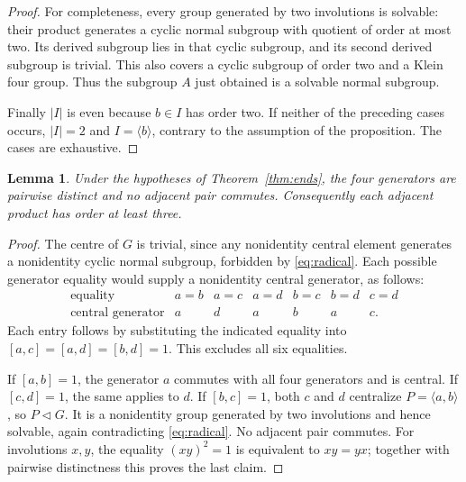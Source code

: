 \documentclass[11pt]{article}
\newtheorem{lemma}[theorem]{Lemma}
\theoremstyle{definition}\newtheorem{definition}[theorem]{Definition}
\newcommand{\gen}[1]{\langle #1\rangle}
\begin{document}
\begin{proof}
For completeness, every group generated by two involutions is solvable:
their product generates a cyclic normal subgroup with quotient of order
at most two.  Its derived subgroup lies in that cyclic subgroup, and its
second derived subgroup is trivial.  This also covers a cyclic subgroup
of order two and a Klein four group.  Thus the subgroup $A$ just obtained
is a solvable normal subgroup.

Finally $|I|$ is even because $b\in I$ has order two.  If neither of
the preceding cases occurs, $|I|=2$ and $I=\gen b$, contrary to the
assumption of the proposition.  The cases are exhaustive.
\end{proof}

\begin{lemma}\label{lem:degeneracies}
Under the hypotheses of Theorem~\ref{thm:ends}, the four generators are
pairwise distinct and no adjacent pair commutes.  Consequently each
adjacent product has order at least three.
\end{lemma}
\begin{proof}
The centre of $G$ is trivial, since any nonidentity central element
generates a nonidentity cyclic normal subgroup, forbidden by
\eqref{eq:radical}.  Each possible generator equality would supply a
nonidentity central generator, as follows:
\[
\begin{array}{c|cccccc}
\text{equality}&a=b&a=c&a=d&b=c&b=d&c=d\\\hline
\text{central generator}&a&d&a&b&a&c.
\end{array}
\]
Each entry follows by substituting the indicated equality into
$[a,c]=[a,d]=[b,d]=1$.  This excludes all six equalities.

If $[a,b]=1$, the generator $a$ commutes with all four generators and
is central.  If $[c,d]=1$, the same applies to $d$.  If $[b,c]=1$,
both $c$ and $d$ centralize $P=\gen{a,b}$, so $P\lhd G$.
It is a nonidentity group generated by two involutions and hence solvable,
again contradicting \eqref{eq:radical}.  No adjacent pair commutes.
For involutions $x,y$, the equality $(xy)^2=1$ is equivalent to
$xy=yx$; together with pairwise distinctness this proves the last claim.
\end{proof}
\end{document}
